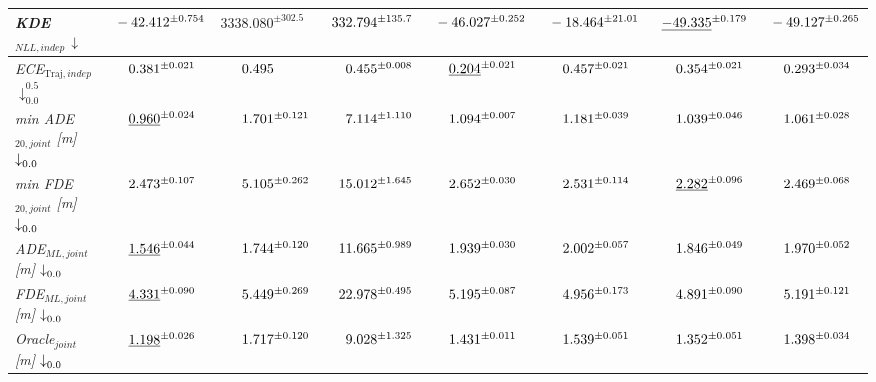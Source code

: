 \begin{tabularx}{\textwidth}{X | Z | Z | Z | Z | Z | Z | Z}
\midrule 
\emph{KDE$_{NLL, indep}$} $\downarrow_{\hphantom{0}}^{\hphantom{0}}$ & {$\hphantom{0}-42.412^{\pm 0.754}$} & {$3338.080^{\pm 302.5}$} & {$\hphantom{0}332.794^{\pm 135.7}$} & {$\hphantom{0}-46.027^{\pm 0.252}$} & {$\hphantom{0}-18.464^{\pm 21.01}$} & {$\hphantom{0}\underline{-49.335}^{\pm 0.179}$} & {$\hphantom{0}-49.127^{\pm 0.265}$} \\ 
\midrule 
\emph{ECE$_{\text{Traj}, indep}$} $\downarrow_{0.0}^{0.5}$ & {$\hphantom{000}0.381^{\pm 0.021}$} & {$\hphantom{000}0.495^{\hphantom{\pm 0.000}}$} & {$\hphantom{000}0.455^{\pm 0.008}$} & {$\hphantom{000}\underline{0.204}^{\pm 0.021}$} & {$\hphantom{000}0.457^{\pm 0.021}$} & {$\hphantom{000}0.354^{\pm 0.021}$} & {$\hphantom{000}0.293^{\pm 0.034}$} \\ 
\midrule 
\emph{min ADE$_{20, joint}$ [m]} $\downarrow_{0.0}^{\hphantom{0}}$ & {$\hphantom{000}\underline{0.960}^{\pm 0.024}$} & {$\hphantom{000}1.701^{\pm 0.121}$} & {$\hphantom{000}7.114^{\pm 1.110}$} & {$\hphantom{000}1.094^{\pm 0.007}$} & {$\hphantom{000}1.181^{\pm 0.039}$} & {$\hphantom{000}1.039^{\pm 0.046}$} & {$\hphantom{000}1.061^{\pm 0.028}$} \\ 
\midrule 
\emph{min FDE$_{20, joint}$ [m]} $\downarrow_{0.0}^{\hphantom{0}}$ & {$\hphantom{000}2.473^{\pm 0.107}$} & {$\hphantom{000}5.105^{\pm 0.262}$} & {$\hphantom{00}15.012^{\pm 1.645}$} & {$\hphantom{000}2.652^{\pm 0.030}$} & {$\hphantom{000}2.531^{\pm 0.114}$} & {$\hphantom{000}\underline{2.282}^{\pm 0.096}$} & {$\hphantom{000}2.469^{\pm 0.068}$} \\ 
\midrule 
\emph{ADE$_{ML, joint}$ [m]} $\downarrow_{0.0}^{\hphantom{0}}$ & {$\hphantom{000}\underline{1.546}^{\pm 0.044}$} & {$\hphantom{000}1.744^{\pm 0.120}$} & {$\hphantom{00}11.665^{\pm 0.989}$} & {$\hphantom{000}1.939^{\pm 0.030}$} & {$\hphantom{000}2.002^{\pm 0.057}$} & {$\hphantom{000}1.846^{\pm 0.049}$} & {$\hphantom{000}1.970^{\pm 0.052}$} \\ 
\midrule 
\emph{FDE$_{ML, joint}$ [m]} $\downarrow_{0.0}^{\hphantom{0}}$ & {$\hphantom{000}\underline{4.331}^{\pm 0.090}$} & {$\hphantom{000}5.449^{\pm 0.269}$} & {$\hphantom{00}22.978^{\pm 0.495}$} & {$\hphantom{000}5.195^{\pm 0.087}$} & {$\hphantom{000}4.956^{\pm 0.173}$} & {$\hphantom{000}4.891^{\pm 0.090}$} & {$\hphantom{000}5.191^{\pm 0.121}$} \\ 
\midrule 
\emph{Oracle$_{joint}$ [m]} $\downarrow_{0.0}^{\hphantom{0}}$ & {$\hphantom{000}\underline{1.198}^{\pm 0.026}$} & {$\hphantom{000}1.717^{\pm 0.120}$} & {$\hphantom{000}9.028^{\pm 1.325}$} & {$\hphantom{000}1.431^{\pm 0.011}$} & {$\hphantom{000}1.539^{\pm 0.051}$} & {$\hphantom{000}1.352^{\pm 0.051}$} & {$\hphantom{000}1.398^{\pm 0.034}$} \\ 

\end{tabularx}
